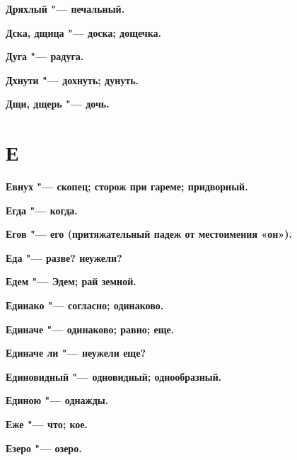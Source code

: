 \begin{mymulticols}{2}
\bfseries Дряхлый\normalfont{} "--- печальный. 




\bfseries Дска, дщица\normalfont{} "--- доска; дощечка. 




\bfseries Дуга\normalfont{} "--- радуга. 




\bfseries Дхнути\normalfont{} "--- дохнуть; дунуть. 




\bfseries Дщи, дщерь\normalfont{} "--- дочь. 




\section{Е}





\bfseries Евнух\normalfont{} "--- скопец; сторож при гареме; придворный. 




\bfseries Егда\normalfont{} "--- когда. 




\bfseries Егов\normalfont{} "--- его (притяжательный падеж от местоимения «он»). 




\bfseries Еда\normalfont{} "--- разве? неужели? 




\bfseries Едем\normalfont{} "--- Эдем; рай земной. 




\bfseries Единако\normalfont{} "--- согласно; одинаково. 




\bfseries Единаче\normalfont{} "--- одинаково; равно; еще. 




\bfseries Единаче ли\normalfont{} "--- неужели еще? 




\bfseries Единовидный\normalfont{} "--- одновидный; однообразный. 




\bfseries Единою\normalfont{} "--- однажды. 




\bfseries Еже\normalfont{} "--- что; кое. 




\bfseries Езеро\normalfont{} "--- озеро. 





\end{mymulticols}
